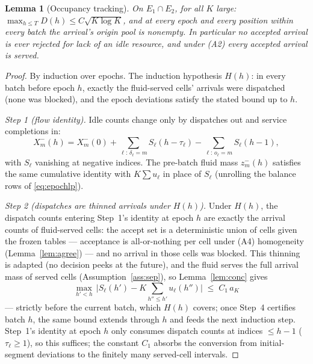\documentclass[11pt]{article}
\newtheorem{lemma}{Lemma}
\begin{document}
\begin{lemma}[Occupancy tracking]
\label{lem:track}
On $E_1 \cap E_2$, for all $K$ large:
$\max_{h \leq T} D(h) \leq C \sqrt{K \log K}$, and at every epoch
and every position within every batch the arrival's origin pool is
nonempty. In particular no accepted arrival is ever rejected
for lack of an idle resource, and under (A2) every accepted arrival is
served.
\end{lemma}

\begin{proof}
By induction over epochs. The induction hypothesis $H(h)$: in every
batch before epoch $h$, exactly the fluid-served cells' arrivals were
dispatched (none was blocked), and the epoch deviations satisfy the
stated bound up to $h$.

\emph{Step 1 (flow identity).} Idle counts change only by dispatches
out and service completions in:
\begin{equation}
  X^{-}_m(h) = X^{-}_m(0)
  + \sum_{\ell:\, \delta_{\ell} = m} S_{\ell}(h - \tau_{\ell})
  - \sum_{\ell:\, o_{\ell} = m} S_{\ell}(h - 1),
\end{equation}
with $S_{\ell}$ vanishing at negative indices.
The pre-batch fluid mass $z^{-}_m(h)$ satisfies the same
cumulative identity with $K \sum u_{\ell}$ in place of $S_{\ell}$
(unrolling the balance rows of \eqref{eq:epochlp}).

\emph{Step 2 (dispatches are thinned arrivals under $H(h)$).} Under
$H(h)$, the dispatch counts entering Step~1's identity at epoch $h$
are exactly the arrival counts of fluid-served cells: the accept set
is a deterministic union of cells given the frozen tables ---
acceptance is all-or-nothing per cell under (A4) homogeneity
(Lemma~\ref{lem:agree}) --- and no arrival in those cells was
blocked. This thinning is adapted (no decision peeks at the future),
and the fluid serves the full arrival mass of served cells
(Assumption~\ref{ass:sep}), so Lemma~\ref{lem:conc} gives
\begin{equation}
  \max_{h' < h}\,
  \bigl| S_{\ell}(h') - K \textstyle\sum_{h'' \leq h'} u_{\ell}(h'') \bigr|
  \;\leq\; C_1\, a_K
\end{equation}
--- strictly before the current batch, which $H(h)$ covers; once
Step~4 certifies batch $h$, the same bound extends through $h$ and
feeds the next induction step. Step~1's identity at epoch $h$ only
consumes dispatch counts at indices $\leq h - 1$
($\tau_{\ell} \geq 1$), so this suffices; the constant $C_1$ absorbs
the conversion from initial-segment deviations to the finitely many
served-cell intervals.


\end{proof}
\end{document}
